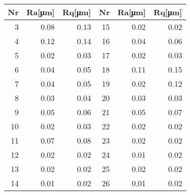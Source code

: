 \begin{tabular}{rrr|rrr}
    Nr & Ra[\si{\um}] & Rq[\si{\um}] & Nr & Ra[\si{\um}] & Rq[\si{\um}] \\ \hline
    3  & 0.08         & 0.13         & 15 & 0.02         & 0.02         \\
    4  & 0.12         & 0.14         & 16 & 0.04         & 0.06         \\
    5  & 0.02         & 0.03         & 17 & 0.02         & 0.03         \\
    6  & 0.04         & 0.05         & 18 & 0.11         & 0.15         \\
    7  & 0.04         & 0.05         & 19 & 0.02         & 0.12         \\
    8  & 0.03         & 0.04         & 20 & 0.03         & 0.03         \\
    9  & 0.05         & 0.06         & 21 & 0.05         & 0.07         \\
    10 & 0.02         & 0.03         & 22 & 0.02         & 0.02         \\
    11 & 0.07         & 0.08         & 23 & 0.02         & 0.02         \\
    12 & 0.02         & 0.02         & 24 & 0.01         & 0.02         \\
    13 & 0.02         & 0.02         & 25 & 0.02         & 0.02         \\
    14 & 0.01         & 0.02         & 26 & 0.01         & 0.02         \\
\end{tabular}

